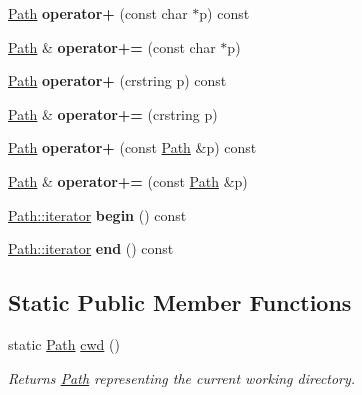 \begin{DoxyCompactItemize}
\hyperlink{classnta_1_1utils_1_1Path}{Path} {\bfseries operator+} (const char $\ast$p) const
\item 
\mbox{\label{classnta_1_1utils_1_1Path_a7bdad4efb2471423c9db3793f5d0aa28}} 
\hyperlink{classnta_1_1utils_1_1Path}{Path} \& {\bfseries operator+=} (const char $\ast$p)
\item 
\mbox{\label{classnta_1_1utils_1_1Path_a28d802076f2e994b05882cf3737e4058}} 
\hyperlink{classnta_1_1utils_1_1Path}{Path} {\bfseries operator+} (crstring p) const
\item 
\mbox{\label{classnta_1_1utils_1_1Path_a5fe72e350fb984ae95cd4fefdb6296a1}} 
\hyperlink{classnta_1_1utils_1_1Path}{Path} \& {\bfseries operator+=} (crstring p)
\item 
\mbox{\label{classnta_1_1utils_1_1Path_aa98c57002370f63a13f91e9964aa7474}} 
\hyperlink{classnta_1_1utils_1_1Path}{Path} {\bfseries operator+} (const \hyperlink{classnta_1_1utils_1_1Path}{Path} \&p) const
\item 
\mbox{\label{classnta_1_1utils_1_1Path_a65dabfa50788fa874f491d9c9d40ba8f}} 
\hyperlink{classnta_1_1utils_1_1Path}{Path} \& {\bfseries operator+=} (const \hyperlink{classnta_1_1utils_1_1Path}{Path} \&p)
\item 
\mbox{\label{classnta_1_1utils_1_1Path_ade397b8da78c752bdb9013c9655e9d3b}} 
\hyperlink{classnta_1_1utils_1_1Path_1_1iterator}{Path\+::iterator} {\bfseries begin} () const
\item 
\mbox{\label{classnta_1_1utils_1_1Path_a1a549e22ea993693a1678b9eb2db6897}} 
\hyperlink{classnta_1_1utils_1_1Path_1_1iterator}{Path\+::iterator} {\bfseries end} () const
\end{DoxyCompactItemize}
\subsection*{Static Public Member Functions}
\begin{DoxyCompactItemize}
\item 
\mbox{\label{classnta_1_1utils_1_1Path_aec5671e324a330a1eb87ff1accc3514c}} 
static \hyperlink{classnta_1_1utils_1_1Path}{Path} \hyperlink{classnta_1_1utils_1_1Path_aec5671e324a330a1eb87ff1accc3514c}{cwd} ()
\begin{DoxyCompactList}\small\item\em Returns \hyperlink{classnta_1_1utils_1_1Path}{Path} representing the current working directory. \end{DoxyCompactList}\end{DoxyCompactItemize}

